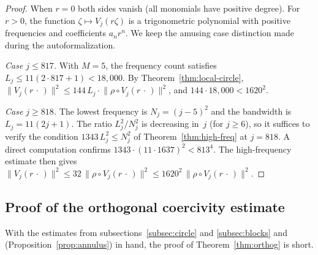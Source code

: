 \documentclass[11pt]{amsart}
\theoremstyle{remark}
\begin{document}
\begin{proof}
When $r = 0$ both sides vanish (all monomials have positive degree).
For $r > 0$, the function $\zeta \mapsto V_j(r\zeta)$ is a trigonometric
polynomial with positive frequencies and coefficients $a_n r^n$. We keep the amusing case distinction made during the autoformalization.
\medskip

\smallskip\noindent
\emph{Case $j \le 817$.}\;
With $M = 5$, the frequency count satisfies $L_j \le 11(2 \cdot 817 + 1)
< 18{,}000$.  By Theorem~\ref{thm:local-circle},
$\lVert V_j(r\,\cdot\,) \rVert^2 \le 144\, L_j \cdot
\lVert \rho \circ V_j(r\,\cdot\,) \rVert^2$, and
$144 \cdot 18{,}000 < 1620^2$.
\medskip

\smallskip\noindent
\emph{Case $j \ge 818$.}\;
The lowest frequency is $N_j = (j{-}5)^2$ and the bandwidth is
$L_j = 11(2j{+}1)$.  The ratio $L_j^2/N_j^2$ is decreasing in~$j$
(for $j \ge 6$), so it suffices to verify the condition
$1343\,L_j^2 \le N_j^2$ of Theorem~\ref{thm:high-freq} at $j = 818$.
A direct computation confirms $1343 \cdot (11 \cdot 1637)^2 < 813^4$.
The high-frequency estimate then gives
$\lVert V_j(r\,\cdot\,) \rVert^2 \le 32\,\lVert \rho \circ V_j(r\,\cdot\,) \rVert^2
\le 1620^2\,\lVert \rho \circ V_j(r\,\cdot\,) \rVert^2$.
\end{proof} 
\subsection{Proof of the orthogonal coercivity estimate}\label{subsec:assembly} With the estimates from subsections~\ref{subsec:circle} and \ref{subsec:blocks} and 
(Proposition~\ref{prop:annulus}) in hand, the proof of
Theorem~\ref{thm:orthog} is short.
\end{document}
